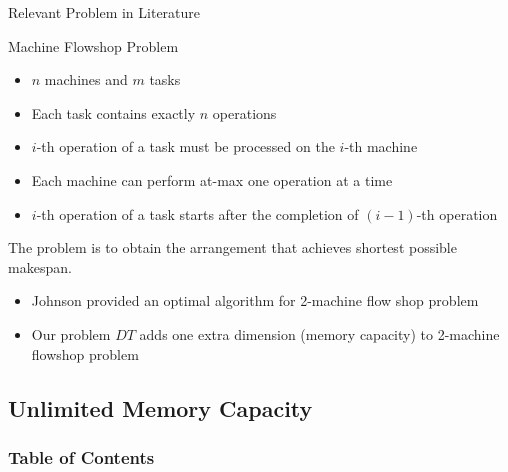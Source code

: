 \documentclass[mathserif,hyperref={pdfpagemode=FullScreen}]{beamer}
\begin{document}
\begin{frame}{Relevant Problem in Literature}
\begin{block}{Machine Flowshop Problem}
	\begin{itemize}
		\item $n$ machines and $m$ tasks 
		\item Each task contains exactly $n$ operations
		\item $i$-th operation of a task must be processed on the $i$-th machine
		\item Each machine can perform at-max one operation at a time
		\item $i$-th operation of a task starts after the completion of $(i-1)$-th operation
	\end{itemize}
	The problem is to obtain the arrangement that achieves shortest possible makespan.
\end{block}

\begin{block}{}
	\begin{itemize}
		\item 	Johnson provided an optimal algorithm for 2-machine flow shop problem
		\item Our  problem $DT$ adds one extra dimension (memory capacity) to 2-machine flowshop problem
	\end{itemize}
\end{block}

\end{frame}

\subsection{Unlimited Memory Capacity}

\begin{frame}
	\frametitle{Table of Contents}
	\tableofcontents[currentsubsection]
\end{frame}

\newcommand{\scomm}{\ensuremath{{S}_{\text{COMM}}}}
\newcommand{\scomp}{\ensuremath{{S}_{\text{COMP}}}}
\end{document}
